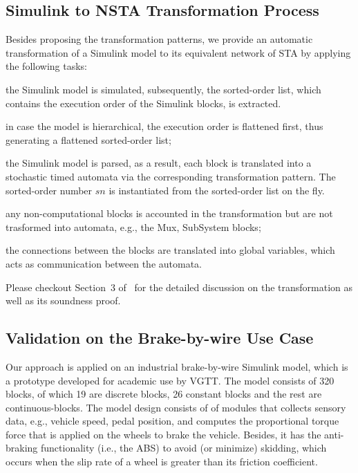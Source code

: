 \subsection*{Simulink to NSTA Transformation Process} 
Besides proposing the transformation patterns, we provide an automatic transformation of a Simulink model to its equivalent network of STA by applying the following tasks:
\begin{enumerate*}[label=(\roman*)]
	\item the Simulink model is simulated, subsequently, the sorted-order list, which contains the execution order of the Simulink blocks, is extracted.
	\item in case the model is hierarchical, the execution order is flattened first, thus generating a flattened sorted-order list;
	\item the Simulink model is parsed, as a result, each block is translated into a stochastic timed automata via the corresponding transformation pattern. The sorted-order number $sn$ is instantiated from the sorted-order list on the fly.
	\item any non-computational blocks is accounted in the transformation but are not trasformed into automata, e.g., the Mux, SubSystem blocks;
	\item the connections between the blocks are translated into global variables, which acts as communication between the automata.
\end{enumerate*}
Please checkout Section~3 of~\cite{Filipovikj2018SimppaalModels} for the detailed discussion on the transformation as well as its soundness proof.


\subsection*{Validation on the Brake-by-wire Use Case} 
Our approach is applied on an industrial brake-by-wire Simulink model, which is a prototype developed for academic use by VGTT. The model consists of 320 blocks, of which 19 are discrete blocks, 26 constant blocks and the rest are continuous-blocks. The model design consists of of modules that collects sensory data, e.g., vehicle speed, pedal position, and computes the proportional torque force that is applied on the wheels to brake the vehicle. Besides, it has the  anti-braking functionality (i.e., the ABS) to avoid (or minimize) skidding, which occurs when the slip rate of a wheel is greater than its friction coefficient. 

